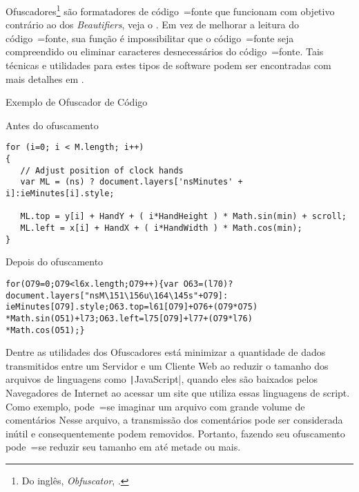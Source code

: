 Ofuscadores\footnote{Do inglês,
\textit{Obfuscator},
.
}
são formatadores de código~=fonte que funcionam com objetivo contrário ao dos \textit{Beautifiers},
veja o .
Em vez de melhorar a leitura do código~=fonte,
sua função é impossibilitar que o código~=fonte seja compreendido ou
eliminar caracteres desnecessários do código~=fonte.
Tais técnicas e
utilidades para estes tipos de software podem ser encontradas com mais detalhes em .
\begin{quadro}[!htb]
\caption[Exemplo de Ofuscador de Código]{Exemplo de Ofuscador de Código \cite{familyOfSourceCodeObfuscators}}
\label{frame:exemploDeOfuscador}
\begin{bluebox}
\begin{code}
\caption{Antes do ofuscamento}
\begin{verbatim}
for (i=0; i < M.length; i++)
{
   // Adjust position of clock hands
   var ML = (ns) ? document.layers['nsMinutes' + i]:ieMinutes[i].style;

   ML.top = y[i] + HandY + ( i*HandHeight ) * Math.sin(min) + scroll;
   ML.left = x[i] + HandX + ( i*HandWidth ) * Math.cos(min);
}
\end{verbatim}
\end{code}

\begin{code}
\caption{Depois do ofuscamento}
\begin{verbatim}
for(O79=0;O79<l6x.length;O79++){var O63=(l70)?
document.layers["nsM\151\156u\164\145s"+O79]:
ieMinutes[O79].style;O63.top=l61[O79]+O76+(O79*O75)
*Math.sin(O51)+l73;O63.left=l75[O79]+l77+(O79*l76)
*Math.cos(O51);}
\end{verbatim}
\end{code}
\end{bluebox}
\end{quadro}

Dentre as utilidades dos Ofuscadores está minimizar a quantidade de dados transmitidos entre um Servidor e
um Cliente Web ao reduzir o tamanho dos arquivos de linguagens como \texttt|JavaScript|,
quando eles são baixados pelos Navegadores de Internet ao acessar um site que utiliza essas linguagens de script.
Como exemplo,
pode~=se imaginar um arquivo com grande volume de comentários Nesse arquivo,
a transmissão dos comentários pode ser considerada inútil e
consequentemente podem removidos.
Portanto,
fazendo seu ofuscamento pode~=se reduzir seu tamanho em até metade ou
mais.

